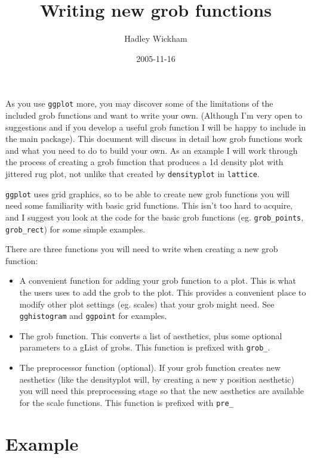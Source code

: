 \documentclass[]{article}
\title{
	Writing new grob functions
}
\author{Hadley Wickham}
\date{2005-11-16}
\begin{document}

\maketitle

As you use \texttt{ggplot} more, you may discover some of the limitations of the included grob functions and want to write your own.  (Although I'm very open to suggestions and if you develop a useful grob function I will be happy to include in the main package).  This document will discuss in detail how grob functions work and what you need to do to build your own.  As an example I will work through the process of creating a grob function that produces a 1d density plot with jittered rug plot, not unlike that created by \texttt{densityplot} in \texttt{lattice}.

\texttt{ggplot} uses grid graphics, so to be able to create new grob functions you will need some familiarity with basic grid functions.  This isn't too hard to acquire, and I suggest you look at the code for the basic grob functions (eg. \texttt{grob\_points}, \texttt{grob\_rect}) for some simple examples.

There are three functions you will need to write when creating a new grob function:

\begin{itemize}
	\item A convenient function for adding your grob function to a plot.  This is what the users uses to add the grob to the plot.  This provides a convenient place to modify other plot settings (eg. scales) that your grob might need.  See \texttt{gghistogram} and \texttt{ggpoint} for examples.
	\item The grob function.  This converts a list of aesthetics, plus some optional parameters to a gList of grobs.  This function is prefixed with \texttt{grob\_}.  
	\item The preprocessor function (optional).  If your grob function creates new aesthetics (like the densityplot will, by creating a new y position aesthetic) you will need this preprocessing stage so that the new aesthetics are available for the scale functions.  This function is prefixed with \texttt{pre\_}
\end{itemize}

\section*{Example}
\end{document}
